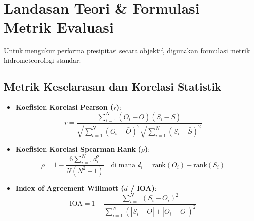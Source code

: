 \documentclass[11pt,a4paper]{article}
\begin{document}
\section{Landasan Teori \& Formulasi Metrik Evaluasi}
Untuk mengukur performa presipitasi secara objektif, digunakan formulasi metrik hidrometeorologi standar:

\subsection{Metrik Keselarasan dan Korelasi Statistik}
\begin{itemize}[leftmargin=*]
    \item \textbf{Koefisien Korelasi Pearson ($r$)}:
    \begin{equation}
        r = \frac{\sum_{i=1}^N (O_i - \bar{O})(S_i - \bar{S})}{\sqrt{\sum_{i=1}^N (O_i - \bar{O})^2} \sqrt{\sum_{i=1}^N (S_i - \bar{S})^2}}
    \end{equation}
    \item \textbf{Koefisien Korelasi Spearman Rank ($\rho$)}:
    \begin{equation}
        \rho = 1 - \frac{6 \sum_{i=1}^N d_i^2}{N(N^2 - 1)} \quad \text{di mana } d_i = \text{rank}(O_i) - \text{rank}(S_i)
    \end{equation}
    \item \textbf{Index of Agreement Willmott ($d$ / IOA)}:
    \begin{equation}
        \text{IOA} = 1 - \frac{\sum_{i=1}^N (S_i - O_i)^2}{\sum_{i=1}^N \left(|S_i - \bar{O}| + |O_i - \bar{O}|\right)^2}
    \end{equation}
\end{itemize}
\end{document}
